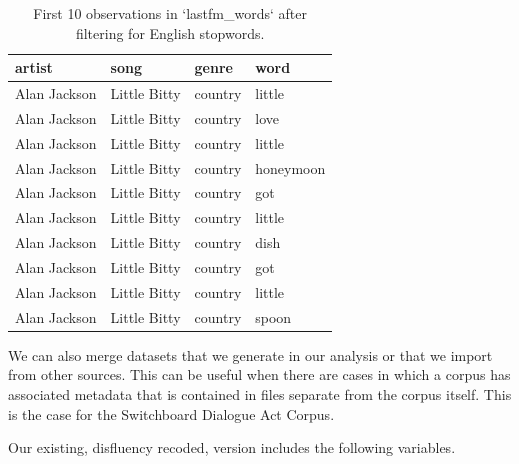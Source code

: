 \documentclass[
]{article}
\begin{document}
\begin{table}

\caption{\label{tab:td-lastfm-words-stopwords-anti-join}First 10 observations in `lastfm_words` after filtering for English stopwords.}
\centering
\begin{tabular}[t]{llll}
\toprule
artist & song & genre & word\\
\midrule
Alan Jackson & Little Bitty & country & little\\
Alan Jackson & Little Bitty & country & love\\
Alan Jackson & Little Bitty & country & little\\
Alan Jackson & Little Bitty & country & honeymoon\\
Alan Jackson & Little Bitty & country & got\\
\addlinespace
Alan Jackson & Little Bitty & country & little\\
Alan Jackson & Little Bitty & country & dish\\
Alan Jackson & Little Bitty & country & got\\
Alan Jackson & Little Bitty & country & little\\
Alan Jackson & Little Bitty & country & spoon\\
\bottomrule
\end{tabular}
\end{table}

We can also merge datasets that we generate in our analysis or that we import from other sources. This can be useful when there are cases in which a corpus has associated metadata that is contained in files separate from the corpus itself. This is the case for the Switchboard Dialogue Act Corpus.

Our existing, disfluency recoded, version includes the following variables.
\end{document}
